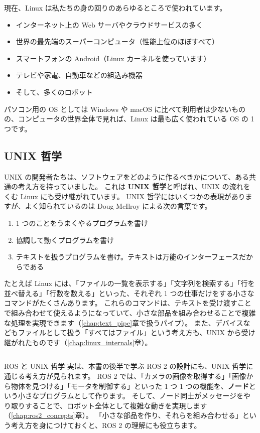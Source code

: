 現在、Linux は私たちの身の回りのあらゆるところで使われています。

\begin{itemize}
  \item インターネット上の Web サーバやクラウドサービスの多く
  \item 世界の最先端のスーパーコンピュータ（性能上位のほぼすべて）
  \item スマートフォンの Android（Linux カーネルを使っています）
  \item テレビや家電、自動車などの組込み機器
  \item そして、多くのロボット
\end{itemize}

パソコン用の OS としては Windows や macOS に比べて利用者は少ないものの、コンピュータの世界全体で見れば、Linux は最も広く使われている OS の 1 つです。

\subsection{UNIX 哲学}

UNIX の開発者たちは、ソフトウェアをどのように作るべきかについて、ある共通の考え方を持っていました。
これは \textbf{UNIX 哲学}と呼ばれ、UNIX の流れをくむ Linux にも受け継がれています。
UNIX 哲学にはいくつかの表現がありますが、よく知られているのは Doug McIlroy による次の言葉です。

\begin{enumerate}
  \item 1 つのことをうまくやるプログラムを書け
  \item 協調して動くプログラムを書け
  \item テキストを扱うプログラムを書け。テキストは万能のインターフェースだからである
\end{enumerate}

たとえば Linux には、「ファイルの一覧を表示する」「文字列を検索する」「行を並べ替える」「行数を数える」といった、それぞれ 1 つの仕事だけをする小さなコマンドがたくさんあります。
これらのコマンドは、テキストを受け渡すことで組み合わせて使えるようになっていて、小さな部品を組み合わせることで複雑な処理を実現できます（\ref{chap:text_pipe}章で扱うパイプ）。
また、デバイスなどもファイルとして扱う「すべてはファイル」という考え方も、UNIX から受け継がれたものです（\ref{chap:linux_internals}章）。

\begin{column}{ROS と UNIX 哲学}
  実は、本書の後半で学ぶ ROS 2 の設計にも、UNIX 哲学に通じる考え方が見られます。
  ROS 2 では、「カメラの画像を取得する」「画像から物体を見つける」「モータを制御する」といった 1 つ 1 つの機能を、\textbf{ノード}という小さなプログラムとして作ります。
  そして、ノード同士がメッセージをやり取りすることで、ロボット全体として複雑な動きを実現します（\ref{chap:ros2_concepts}章）。
  「小さな部品を作り、それらを組み合わせる」という考え方を身につけておくと、ROS 2 の理解にも役立ちます。
\end{column}

